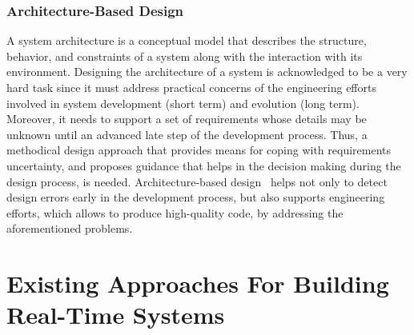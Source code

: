 \subsubsection{Architecture-Based Design}

A system architecture is a conceptual model that describes the structure, behavior, and 
constraints 
of a system along with the interaction with its environment. Designing the architecture of 
a system is acknowledged to be a very hard task since it must address practical concerns
of the engineering efforts~\cite{intro:ab2} involved in system development (short term) 
and evolution (long term). Moreover, it needs to support a set of requirements whose
details may be unknown until an advanced late step of the development process. 
Thus, a methodical design approach that provides means for coping with requirements uncertainty,
and proposes guidance that helps in the decision making during the design process, is needed.
Architecture-based design~\cite{intro:ab} helps not only to detect design errors early in the 
development process, but also supports engineering efforts, which allows to produce 
high-quality code, by addressing the aforementioned problems.

\section{Existing Approaches For Building Real-Time Systems}

